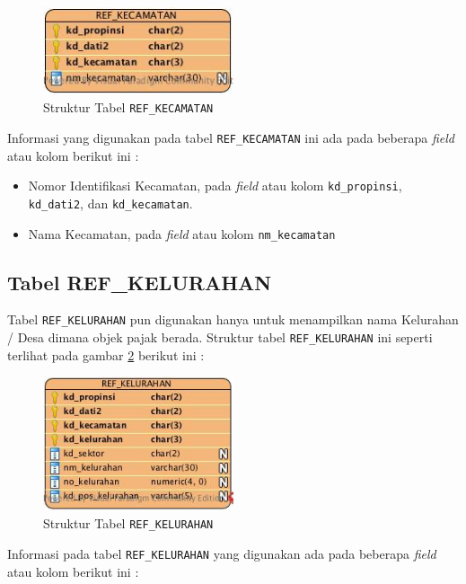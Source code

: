 \begin{figure}[H]
	\centering
	\includegraphics[width=0.5\textwidth]{./resources/struktur-tabel-ref-kec}
	\caption{Struktur Tabel \texttt{REF\_KECAMATAN}}
	\label{fig:struktur-ref-kec}	
\end{figure}

Informasi yang digunakan pada tabel \texttt{REF\_KECAMATAN} ini ada pada beberapa \textit{field} atau kolom berikut ini :

\begin{itemize}
	\item Nomor Identifikasi Kecamatan, pada \textit{field} atau kolom \texttt{kd\_propinsi}, \texttt{kd\_dati2}, dan \texttt{kd\_kecamatan}.
	\item Nama Kecamatan, pada \textit{field} atau kolom \texttt{nm\_kecamatan}
\end{itemize}

\subsection{Tabel REF\_KELURAHAN}

Tabel \texttt{REF\_KELURAHAN} pun digunakan hanya untuk menampilkan nama Kelurahan / Desa dimana objek pajak berada. Struktur tabel \texttt{REF\_KELURAHAN} ini seperti terlihat pada gambar \ref{fig:struktur-ref-kel} berikut ini :

\begin{figure}[H]
	\centering
	\includegraphics[width=0.5\textwidth]{./resources/struktur-tabel-ref-kel}
	\caption{Struktur Tabel \texttt{REF\_KELURAHAN}}
	\label{fig:struktur-ref-kel}
\end{figure}

Informasi pada tabel \texttt{REF\_KELURAHAN} yang digunakan ada pada beberapa \textit{field} atau kolom berikut ini :

